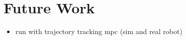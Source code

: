 \section{Future Work} \label{sec:futureWork}

\begin{itemize}
  \item run with trajectory tracking \acrshort{mpc} (sim and real robot)
\end{itemize}

